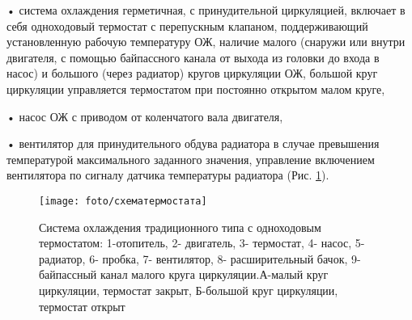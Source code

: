 • система охлаждения герметичная, с принудительной циркуляцией, включает в себя одноходовый термостат с перепускным клапаном, поддерживающий установленную рабочую температуру ОЖ, наличие малого (снаружи или внутри двигателя, с помощью байпассного канала от выхода из головки до входа в насос) и большого (через радиатор) кругов циркуляции ОЖ, 
большой круг циркуляции управляется термостатом при постоянно открытом малом круге,

• насос ОЖ с приводом от коленчатого вала двигателя,

• вентилятор  для принудительного обдува радиатора в случае превышения температурой максимального заданного значения, управление включением вентилятора  по сигналу датчика температуры радиатора (Рис. \ref{схеатермостата}).


\begin{figure}
    \centering
    \texttt{[image: foto/схематермостата]}
    \caption{ Система охлаждения традиционного типа с одноходовым термостатом: 1-отопитель, 2- двигатель, 3- термостат, 4- насос, 5- радиатор, 6- пробка, 7- вентилятор, 8- расширительный бачок, 9- байпассный канал малого круга циркуляции.А-малый круг циркуляции, термостат закрыт, Б-большой  круг циркуляции, термостат открыт}
    \label{схеатермостата}
\end{figure}


